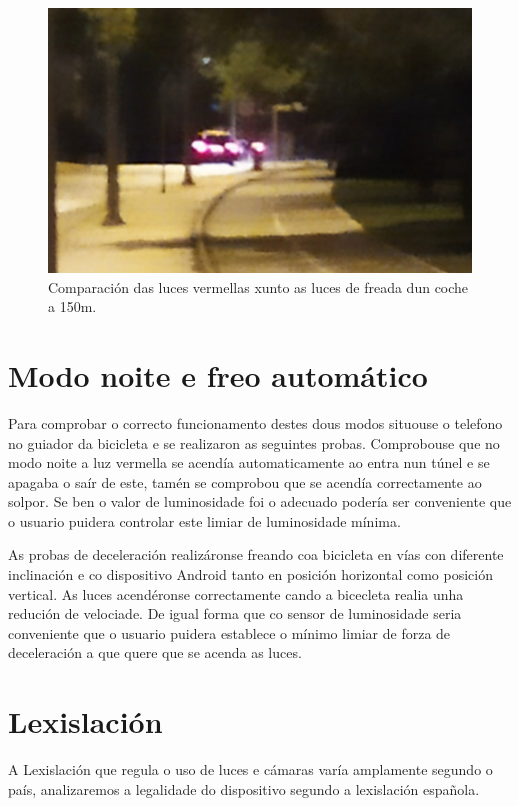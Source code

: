 \begin{figure}[tbp]
  \centering
  \includegraphics[scale=0.8]{imaxes/foto-coche.png}
  \caption{Comparación das luces vermellas xunto as luces de freada dun coche a 150m.}
  \label{fig:foto_coche}
\end{figure}

\section{Modo noite e freo automático}
Para comprobar o correcto funcionamento destes dous modos situouse o telefono no guiador da bicicleta e se realizaron as seguintes probas.
Comprobouse que no modo noite a luz vermella se acendía automaticamente ao entra nun túnel e se apagaba o saír de este, tamén se comprobou que se acendía correctamente ao solpor. Se ben o valor de luminosidade foi o adecuado podería ser conveniente que o usuario puidera controlar este limiar de luminosidade mínima.

As probas de deceleración realizáronse freando coa bicicleta en vías con diferente inclinación e co dispositivo Android tanto en posición horizontal como posición vertical. As luces acendéronse correctamente cando a bicecleta realia unha redución de velociade. De igual forma que co sensor de luminosidade seria conveniente que o usuario puidera establece o mínimo limiar de forza de deceleración a que quere que se acenda as luces.


\section{Lexislación}
A Lexislación que regula o uso de luces e cámaras varía amplamente segundo o país, analizaremos a legalidade do dispositivo segundo a lexislación española.
